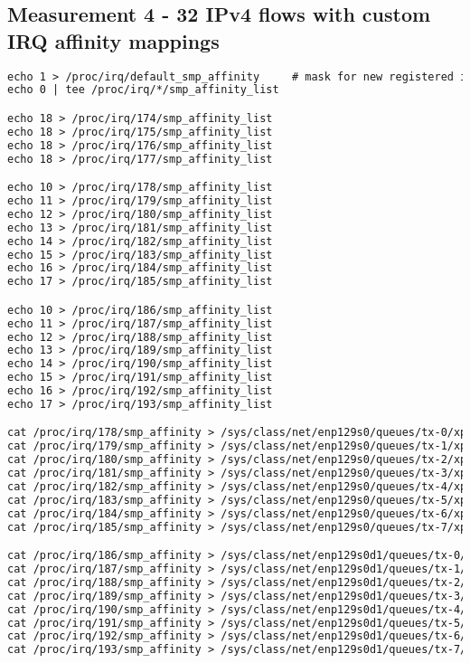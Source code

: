 
\subsection{Measurement 4 - 32 IPv4 flows with custom IRQ affinity mappings}

\begin{lstlisting}[language=TeX]
echo 1 > /proc/irq/default_smp_affinity     # mask for new registered irqs
echo 0 | tee /proc/irq/*/smp_affinity_list

echo 18 > /proc/irq/174/smp_affinity_list 
echo 18 > /proc/irq/175/smp_affinity_list 
echo 18 > /proc/irq/176/smp_affinity_list 
echo 18 > /proc/irq/177/smp_affinity_list 

echo 10 > /proc/irq/178/smp_affinity_list 
echo 11 > /proc/irq/179/smp_affinity_list 
echo 12 > /proc/irq/180/smp_affinity_list 
echo 13 > /proc/irq/181/smp_affinity_list 
echo 14 > /proc/irq/182/smp_affinity_list 
echo 15 > /proc/irq/183/smp_affinity_list 
echo 16 > /proc/irq/184/smp_affinity_list 
echo 17 > /proc/irq/185/smp_affinity_list

echo 10 > /proc/irq/186/smp_affinity_list
echo 11 > /proc/irq/187/smp_affinity_list 
echo 12 > /proc/irq/188/smp_affinity_list 
echo 13 > /proc/irq/189/smp_affinity_list 
echo 14 > /proc/irq/190/smp_affinity_list 
echo 15 > /proc/irq/191/smp_affinity_list 
echo 16 > /proc/irq/192/smp_affinity_list 
echo 17 > /proc/irq/193/smp_affinity_list

cat /proc/irq/178/smp_affinity > /sys/class/net/enp129s0/queues/tx-0/xps_cpus
cat /proc/irq/179/smp_affinity > /sys/class/net/enp129s0/queues/tx-1/xps_cpus
cat /proc/irq/180/smp_affinity > /sys/class/net/enp129s0/queues/tx-2/xps_cpus
cat /proc/irq/181/smp_affinity > /sys/class/net/enp129s0/queues/tx-3/xps_cpus
cat /proc/irq/182/smp_affinity > /sys/class/net/enp129s0/queues/tx-4/xps_cpus
cat /proc/irq/183/smp_affinity > /sys/class/net/enp129s0/queues/tx-5/xps_cpus
cat /proc/irq/184/smp_affinity > /sys/class/net/enp129s0/queues/tx-6/xps_cpus
cat /proc/irq/185/smp_affinity > /sys/class/net/enp129s0/queues/tx-7/xps_cpus

cat /proc/irq/186/smp_affinity > /sys/class/net/enp129s0d1/queues/tx-0/xps_cpus
cat /proc/irq/187/smp_affinity > /sys/class/net/enp129s0d1/queues/tx-1/xps_cpus
cat /proc/irq/188/smp_affinity > /sys/class/net/enp129s0d1/queues/tx-2/xps_cpus
cat /proc/irq/189/smp_affinity > /sys/class/net/enp129s0d1/queues/tx-3/xps_cpus
cat /proc/irq/190/smp_affinity > /sys/class/net/enp129s0d1/queues/tx-4/xps_cpus
cat /proc/irq/191/smp_affinity > /sys/class/net/enp129s0d1/queues/tx-5/xps_cpus
cat /proc/irq/192/smp_affinity > /sys/class/net/enp129s0d1/queues/tx-6/xps_cpus
cat /proc/irq/193/smp_affinity > /sys/class/net/enp129s0d1/queues/tx-7/xps_cpus
\end{lstlisting}

